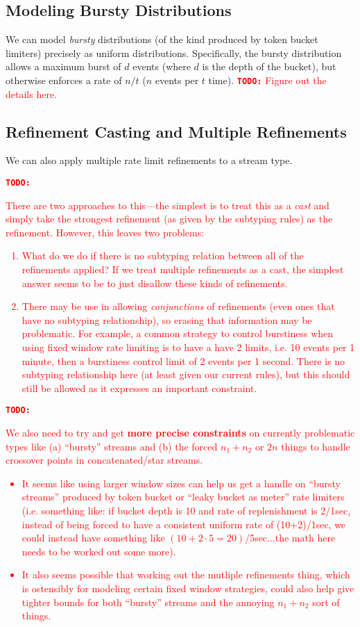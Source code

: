 \documentclass[acmsmall,nonacm,screen]{acmart}
\newcommand{\todo}[1]{\textcolor{red}{\textbf{\texttt{TODO:}} {#1}}}
\begin{document}
\subsection{Modeling Bursty Distributions}
We can model \textit{bursty} distributions (of the kind produced by token bucket limiters) precisely as uniform distributions. Specifically, the bursty distribution allows a maximum burst of $d$ events (where $d$ is the depth of the bucket), but otherwise enforces a rate of $n/t$ ($n$ events per $t$ time). \todo{Figure out the details here.}

\subsection{Refinement Casting and Multiple Refinements}
We can also apply multiple rate limit refinements to a stream type. \todo{There are two approaches to this—the simplest is to treat this as a \textit{cast} and simply take the strongest refinement (as given by the subtyping rules) as the refinement. However, this leaves two problems:
  \begin{enumerate}
  \item What do we do if there is no subtyping relation between all of the refinements applied? If we treat multiple refinements as a cast, the simplest answer seems to be to just disallow these kinds of refinements.
  \item There may be use in allowing \textit{conjunctions} of refinements (even ones that have no subtyping relationship), so erasing that information may be problematic. For example, a common strategy to control burstiness when using fixed window rate limiting is to have a have 2 limits, i.e. 10 events per 1 minute, then a burstiness control limit of 2 events per 1 second. There is no subtyping relationship here (at least given our current rules), but this should still be allowed as it expresses an important constraint.
  \end{enumerate}}

\todo{We also need to try and get \textbf{more precise constraints} on currently problematic types like (a) ``bursty'' streams and (b) the forced $n_1+n_2$ or $2n$ things to handle crossover points in concatenated/star streams.
  \begin{itemize}
  \item It seems like using larger window sizes can help us get a handle on ``bursty streams'' produced by token bucket or ``leaky bucket as meter'' rate limiters (i.e. something like: if bucket depth is 10 and rate of replenishment is 2/1sec, instead of being forced to have a consistent uniform rate of (10+2)/1sec, we could instead have something like $(10+2\cdot 5 = 20)$/5sec...the math here needs to be worked out some more).
  \item It also seems possible that working out the mutliple refinements thing, which is ostensibly for modeling certain fixed window strategies, could also help give tighter bounds for both ``bursty'' streams and the annoying $n_1+n_2$ sort of things.
  \end{itemize}}




\end{document}
